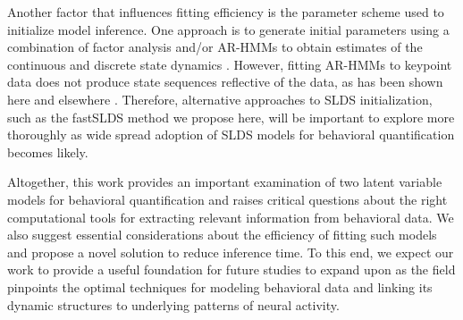 Another factor that influences fitting efficiency is the parameter scheme used to initialize model inference. One approach is to generate initial parameters using a combination of factor analysis and/or AR-HMMs to obtain estimates of the continuous and discrete state dynamics \cite{linderman_recurrent_2016, linderman_hierarchical_2019, weinreb_keypoint-moseq_2023}. However, fitting AR-HMMs to keypoint data does not produce state sequences reflective of the data, as has been shown here and elsewhere \cite{wu_deep_2020, luxem_identifying_2022, weinreb_keypoint-moseq_2023}. Therefore, alternative approaches to SLDS initialization, such as the fastSLDS method we propose here, will be important to explore more thoroughly as wide spread adoption of SLDS models for behavioral quantification becomes likely.  

Altogether, this work provides an important examination of two latent variable models for behavioral quantification and raises critical questions about the right computational tools for extracting relevant information from behavioral data. We also suggest essential considerations about the efficiency of fitting such models and propose a novel solution to reduce inference time. To this end, we expect our work to provide a useful foundation for future studies to expand upon as the field pinpoints the optimal techniques for modeling behavioral data and linking its dynamic structures to underlying patterns of neural activity. 